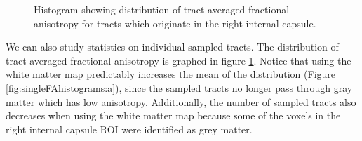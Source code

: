 \begin{figure}
  \label{fig:singleFAhistograms}
	\caption{Histogram showing distribution of tract-averaged fractional anisotropy for tracts which originate in the right internal capsule.}
\end{figure}

We can also study statistics on individual sampled tracts.  The distribution of tract-averaged fractional anisotropy is graphed in figure \ref{fig:singleFAhistograms}.  Notice that using the white matter map predictably increases the mean of the distribution (Figure \ref{fig:singleFAhistograms:a}), since the sampled tracts no longer pass through gray matter which has low anisotropy.  Additionally, the number of sampled tracts also decreases when using the white matter map because some of the voxels in the right internal capsule ROI were identified as grey matter.

